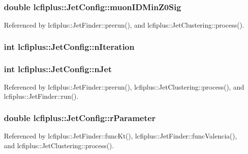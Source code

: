 \subsubsection[{muon\-I\-D\-Min\-Z0\-Sig}]{\setlength{\rightskip}{0pt plus 5cm}double lcfiplus\-::\-Jet\-Config\-::muon\-I\-D\-Min\-Z0\-Sig}\label{structlcfiplus_1_1JetConfig_a158738f113e4e91deda8fabc8f90f8f6}


Referenced by lcfiplus\-::\-Jet\-Finder\-::prerun(), and lcfiplus\-::\-Jet\-Clustering\-::process().

\subsubsection[{n\-Iteration}]{\setlength{\rightskip}{0pt plus 5cm}int lcfiplus\-::\-Jet\-Config\-::n\-Iteration}\label{structlcfiplus_1_1JetConfig_afc280770bc3679f3234754b28d06de1d}
\subsubsection[{n\-Jet}]{\setlength{\rightskip}{0pt plus 5cm}int lcfiplus\-::\-Jet\-Config\-::n\-Jet}\label{structlcfiplus_1_1JetConfig_a939185842313b5d6dd43ba2af1e5e77d}


Referenced by lcfiplus\-::\-Jet\-Finder\-::prerun(), lcfiplus\-::\-Jet\-Clustering\-::process(), and lcfiplus\-::\-Jet\-Finder\-::run().

\subsubsection[{r\-Parameter}]{\setlength{\rightskip}{0pt plus 5cm}double lcfiplus\-::\-Jet\-Config\-::r\-Parameter}\label{structlcfiplus_1_1JetConfig_a1a01504e890049f4043ca522dfb76029}


Referenced by lcfiplus\-::\-Jet\-Finder\-::func\-Kt(), lcfiplus\-::\-Jet\-Finder\-::func\-Valencia(), and lcfiplus\-::\-Jet\-Clustering\-::process().


